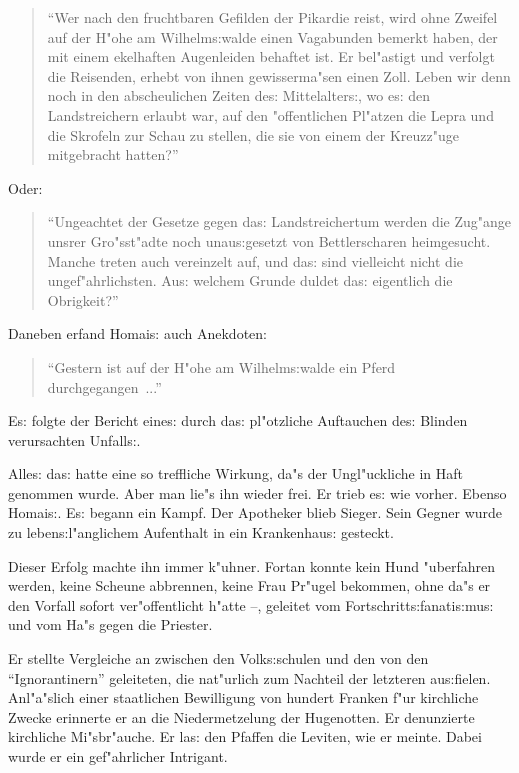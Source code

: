 \documentclass[oneside,12pt]{book}
\newcommand{\s}{s:}%
\begin{document}
\begin{quotation}
"`Wer nach den fruchtbaren Gefilden der Pikardie reist, wird ohne
Zweifel auf der H"ohe am Wilhelm{\s}walde einen Vagabunden bemerkt
haben, der mit einem ekelhaften Augenleiden behaftet ist. Er
bel"astigt und verfolgt die Reisenden, erhebt von ihnen
gewisserma"sen einen Zoll. Leben wir denn noch in den
abscheulichen Zeiten de{\s} Mittelalter{\s}, wo e{\s} den
Landstreichern erlaubt war, auf den "offentlichen Pl"atzen die
Lepra und die Skrofeln zur Schau zu stellen, die sie von einem der
Kreuzz"uge mitgebracht hatten?"'
\end{quotation}

Oder:

\begin{quotation}
"`Ungeachtet der Gesetze gegen da{\s} Landstreichertum werden die
Zug"ange unsrer Gro"sst"adte noch unau{\s}gesetzt von
Bettlerscharen heimgesucht. Manche treten auch vereinzelt auf, und
da{\s} sind vielleicht nicht die ungef"ahrlichsten. Au{\s} welchem
Grunde duldet da{\s} eigentlich die Obrigkeit?"'
\end{quotation}

Daneben erfand Homai{\s} auch Anekdoten:

\begin{quotation}
"`Gestern ist auf der H"ohe am Wilhelm{\s}walde ein Pferd
durchgegangen~..."'
\end{quotation}

E{\s} folgte der Bericht eine{\s} durch da{\s} pl"otzliche
Auftauchen de{\s} Blinden verursachten Unfall{\s}.

Alle{\s} da{\s} hatte eine so treffliche Wirkung, da"s der
Ungl"uckliche in Haft genommen wurde. Aber man lie"s ihn wieder
frei. Er trieb e{\s} wie vorher. Ebenso Homai{\s}. E{\s} begann
ein Kampf. Der Apotheker blieb Sieger. Sein Gegner wurde zu
leben{\s}l"anglichem Aufenthalt in ein Krankenhau{\s} gesteckt.

Dieser Erfolg machte ihn immer k"uhner. Fortan konnte kein Hund
"uberfahren werden, keine Scheune abbrennen, keine Frau Pr"ugel
bekommen, ohne da"s er den Vorfall sofort ver"offentlicht h"atte
--, geleitet vom Fortschritt{\s}fanati{\s}mu{\s} und vom Ha"s
gegen die Priester.

Er stellte Vergleiche an zwischen den Volk{\s}schulen und den von
den "`Ignorantinern"' geleiteten, die nat"urlich zum Nachteil der
letzteren au{\s}fielen. Anl"a"slich einer staatlichen Bewilligung
von hundert Franken f"ur kirchliche Zwecke erinnerte er an die
Niedermetzelung der Hugenotten. Er denunzierte kirchliche
Mi"sbr"auche. Er la{\s} den Pfaffen die Leviten, wie er meinte.
Dabei wurde er ein gef"ahrlicher Intrigant.
\end{document}
